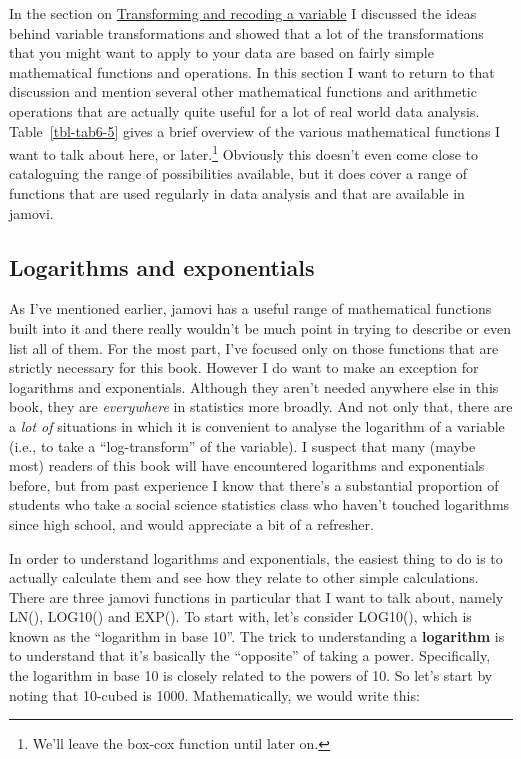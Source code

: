 \documentclass[
  a4paper,
]{book}
\begin{document}
In the section on
\protect\hyperlink{sec-Transforming-and-recoding-a-variable}{Transforming
and recoding a variable} I discussed the ideas behind variable
transformations and showed that a lot of the transformations that you
might want to apply to your data are based on fairly simple mathematical
functions and operations. In this section I want to return to that
discussion and mention several other mathematical functions and
arithmetic operations that are actually quite useful for a lot of real
world data analysis. Table~\ref{tbl-tab6-5} gives a brief overview of
the various mathematical functions I want to talk about here, or
later.\footnote{We'll leave the box-cox function until later on.}
Obviously this doesn't even come close to cataloguing the range of
possibilities available, but it does cover a range of functions that are
used regularly in data analysis and that are available in jamovi.

\hypertarget{logarithms-and-exponentials}{%
\subsection{Logarithms and
exponentials}\label{logarithms-and-exponentials}}

As I've mentioned earlier, jamovi has a useful range of mathematical
functions built into it and there really wouldn't be much point in
trying to describe or even list all of them. For the most part, I've
focused only on those functions that are strictly necessary for this
book. However I do want to make an exception for logarithms and
exponentials. Although they aren't needed anywhere else in this book,
they are \emph{everywhere} in statistics more broadly. And not only
that, there are a \emph{lot of} situations in which it is convenient to
analyse the logarithm of a variable (i.e., to take a ``log-transform''
of the variable). I suspect that many (maybe most) readers of this book
will have encountered logarithms and exponentials before, but from past
experience I know that there's a substantial proportion of students who
take a social science statistics class who haven't touched logarithms
since high school, and would appreciate a bit of a refresher.

In order to understand logarithms and exponentials, the easiest thing to
do is to actually calculate them and see how they relate to other simple
calculations. There are three jamovi functions in particular that I want
to talk about, namely LN(), LOG10() and EXP(). To start with, let's
consider LOG10(), which is known as the ``logarithm in base 10''. The
trick to understanding a \textbf{logarithm} is to understand that it's
basically the ``opposite'' of taking a power. Specifically, the
logarithm in base 10 is closely related to the powers of 10. So let's
start by noting that 10-cubed is 1000. Mathematically, we would write
this:
\end{document}
